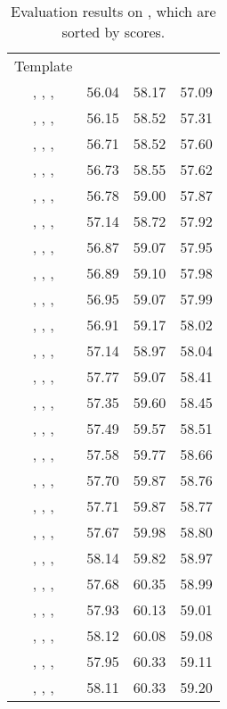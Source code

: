\documentclass[11pt]{article}
\begin{document}
\begin{table}[]
\small
    \centering
    \begin{tabular}{c|ccc}
    \toprule
    \multirow{2}{*}{Template} & \multicolumn{3}{c}{} \\ 
    &  &  &  \\
    \midrule
, , ,  & 56.04 & 58.17 & 57.09 \\
, , ,  & 56.15 & 58.52 & 57.31 \\
, , ,  & 56.71 & 58.52 & 57.60 \\
, , ,  & 56.73 & 58.55 & 57.62 \\
, , ,  & 56.78 & 59.00 & 57.87 \\
, , ,  & 57.14 & 58.72 & 57.92 \\
, , ,  & 56.87 & 59.07 & 57.95 \\
, , ,  & 56.89 & 59.10 & 57.98 \\
, , ,  & 56.95 & 59.07 & 57.99 \\
, , ,  & 56.91 & 59.17 & 58.02 \\
, , ,  & 57.14 & 58.97 & 58.04 \\
, , ,  & 57.77 & 59.07 & 58.41 \\
, , ,  & 57.35 & 59.60 & 58.45 \\
, , ,  & 57.49 & 59.57 & 58.51 \\
, , ,  & 57.58 & 59.77 & 58.66 \\
, , ,  & 57.70 & 59.87 & 58.76 \\
, , ,  & 57.71 & 59.87 & 58.77 \\
, , ,  & 57.67 & 59.98 & 58.80 \\
, , ,  & 58.14 & 59.82 & 58.97 \\
, , ,  & 57.68 & 60.35 & 58.99 \\
, , ,  & 57.93 & 60.13 & 59.01 \\
, , ,  & 58.12 & 60.08 & 59.08 \\
, , ,  & 57.95 & 60.33 & 59.11 \\
, , ,  & 58.11 & 60.33 & 59.20 \\
\bottomrule
    \end{tabular}
    \caption{Evaluation results on , which are sorted by  scores.}
    \label{table:rest16_appendix_without_marker}
\end{table}
\end{document}
